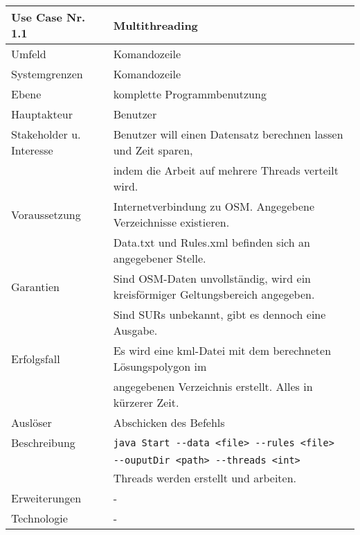 \begin{tabular}{| l | l |}
 \hline
 \textbf{Use Case Nr. 1.1} & Multithreading\\
 \hline
 Umfeld & Komandozeile\\
 \hline
 Systemgrenzen & Komandozeile\\
 \hline
 Ebene & komplette Programmbenutzung\\
 \hline
 Hauptakteur & Benutzer\\
 \hline
 Stakeholder u. Interesse & Benutzer will einen Datensatz berechnen lassen und Zeit sparen,\\
			  & indem die Arbeit auf mehrere Threads verteilt wird.\\
 \hline
 Voraussetzung & Internetverbindung zu OSM. Angegebene Verzeichnisse existieren.\\
	      & Data.txt und Rules.xml befinden sich an angegebener Stelle. \\
 \hline
 Garantien & Sind OSM-Daten unvollständig, wird ein kreisförmiger Geltungsbereich angegeben.\\
	  & Sind SURs unbekannt, gibt es dennoch eine Ausgabe.\\
 \hline
 Erfolgsfall & Es wird eine kml-Datei mit dem berechneten Lösungspolygon im\\
	    & angegebenen Verzeichnis erstellt. Alles in kürzerer Zeit.\\
 \hline
 Auslöser & Abschicken des Befehls\\
 \hline
 Beschreibung & \verb|java Start --data <file> --rules <file>|\\
	      & \hspace{24pt}\verb|--ouputDir <path> --threads <int>|\\
	      & Threads werden erstellt und arbeiten.\\
 \hline
 Erweiterungen & -\\
 \hline
 Technologie & -\\
 \hline
\end{tabular}


